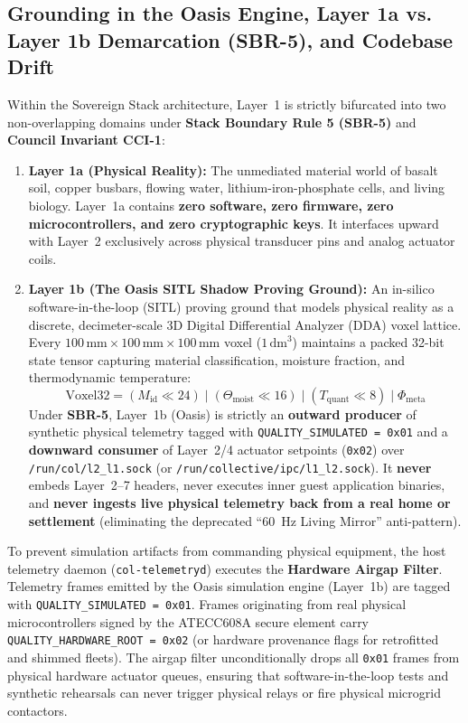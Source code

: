 \subsection{Grounding in the Oasis Engine, Layer 1a vs. Layer 1b Demarcation (SBR-5), and Codebase Drift}
Within the Sovereign Stack architecture, Layer~1 is strictly bifurcated into two non-overlapping domains under \textbf{Stack Boundary Rule 5 (SBR-5)} and \textbf{Council Invariant CCI-1}:
\begin{enumerate}
    \item \textbf{Layer 1a (Physical Reality):} The unmediated material world of basalt soil, copper busbars, flowing water, lithium-iron-phosphate cells, and living biology. Layer~1a contains \textbf{zero software, zero firmware, zero microcontrollers, and zero cryptographic keys}. It interfaces upward with Layer~2 exclusively across physical transducer pins and analog actuator coils.
    \item \textbf{Layer 1b (The Oasis SITL Shadow Proving Ground):} An in-silico software-in-the-loop (SITL) proving ground that models physical reality as a discrete, decimeter-scale 3D Digital Differential Analyzer (DDA) voxel lattice. Every $100\,\mathrm{mm} \times 100\,\mathrm{mm} \times 100\,\mathrm{mm}$ voxel ($1\,\mathrm{dm}^3$) maintains a packed 32-bit state tensor capturing material classification, moisture fraction, and thermodynamic temperature:
\begin{equation}
\mathrm{Voxel32} = (M_{\mathrm{id}} \ll 24) \mid (\Theta_{\mathrm{moist}} \ll 16) \mid (T_{\mathrm{quant}} \ll 8) \mid \Phi_{\mathrm{meta}}
\label{eq:packed_voxel_tensor}
\end{equation}
    Under \textbf{SBR-5}, Layer~1b (Oasis) is strictly an \textbf{outward producer} of synthetic physical telemetry tagged with \texttt{QUALITY\_SIMULATED = 0x01} and a \textbf{downward consumer} of Layer~2/4 actuator setpoints (\texttt{0x02}) over \texttt{/run/col/l2\_l1.sock} (or \texttt{/run/collective/ipc/l1\_l2.sock}). It \textbf{never} embeds Layer~2--7 headers, never executes inner guest application binaries, and \textbf{never ingests live physical telemetry back from a real home or settlement} (eliminating the deprecated ``60~Hz Living Mirror'' anti-pattern).
\end{enumerate}

To prevent simulation artifacts from commanding physical equipment, the host telemetry daemon (\texttt{col-telemetryd}) executes the \textbf{Hardware Airgap Filter}. Telemetry frames emitted by the Oasis simulation engine (Layer~1b) are tagged with \texttt{QUALITY\_SIMULATED = 0x01}. Frames originating from real physical microcontrollers signed by the ATECC608A secure element carry \texttt{QUALITY\_HARDWARE\_ROOT = 0x02} (or hardware provenance flags for retrofitted and shimmed fleets). The airgap filter unconditionally drops all \texttt{0x01} frames from physical hardware actuator queues, ensuring that software-in-the-loop tests and synthetic rehearsals can never trigger physical relays or fire physical microgrid contactors.

